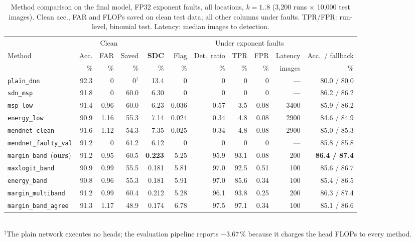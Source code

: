 \documentclass[10pt,a4paper]{article}
\newcommand{\meth}[1]{\texttt{#1}}
\newcommand{\ours}{\meth{margin\_band}}
\begin{document}
\begin{table}[H]
\centering\small
\setlength{\tabcolsep}{3.6pt}
\caption{Method comparison on the final model, FP32 exponent faults, all locations, $k=1..8$
(3{,}200 runs $\times$ 10{,}000 test images). Clean acc., FAR and FLOPs saved on clean test data; all other
columns under faults. TPR/FPR: run-level, binomial test. Latency: median images to detection.}
\label{tab:main}
\begin{adjustbox}{max width=\linewidth}
\begin{tabular}{@{}lrrrrrrrrrr@{}}
\toprule
 & \multicolumn{3}{c}{Clean} & \multicolumn{7}{c}{Under exponent faults} \\
\cmidrule(lr){2-4}\cmidrule(l){5-11}
Method & Acc. & FAR & Saved & \textbf{SDC} & Flag & Det.\ ratio & TPR & FPR & Latency & Acc.\ / fallback \\
 & \% & \% & \% & \% & \% & \% & \% & \% & images & \% \\
\midrule
\meth{plain\_dnn}          & 92.3 & 0    & 0$^\dagger$ & 13.4  & 0      & 0    & 0    & 0     & ---   & 80.0 / 80.0 \\
\meth{sdn\_msp}            & 91.8 & 0    & 60.0 & 6.30  & 0      & 0    & 0    & 0     & ---   & 86.2 / 86.2 \\
\meth{msp\_low}            & 91.4 & 0.96 & 60.0 & 6.23  & 0.036  & 0.57 & 3.5  & 0.08  & 3400  & 85.9 / 86.2 \\
\meth{energy\_low}         & 90.9 & 1.16 & 55.3 & 7.14  & 0.024  & 0.34 & 4.8  & 0.08  & 2900  & 84.6 / 84.9 \\
\meth{mendnet\_clean}      & 91.6 & 1.12 & 54.3 & 7.35  & 0.025  & 0.34 & 4.8  & 0.08  & 2900  & 85.0 / 85.3 \\
\meth{mendnet\_faulty\_val}& 91.2 & 0    & 61.2 & 6.12  & 0      & 0    & 0    & 0     & ---   & 85.8 / 85.8 \\
\midrule
\ours\ (\textbf{ours})     & 91.2 & 0.95 & 60.5 & \textbf{0.223} & 5.25 & 95.9 & 93.1 & 0.08 & 200 & \textbf{86.4 / 87.4} \\
\meth{maxlogit\_band}      & 90.9 & 0.99 & 55.5 & 0.181 & 5.81   & 97.0 & 92.5 & 0.51  & 100   & 85.6 / 86.7 \\
\meth{energy\_band}        & 90.8 & 0.96 & 55.3 & 0.181 & 5.91   & 97.0 & 85.6 & 0.34  & 100   & 85.4 / 86.5 \\
\meth{margin\_multiband}   & 91.2 & 0.99 & 60.4 & 0.212 & 5.28   & 96.1 & 93.8 & 0.25  & 200   & 86.3 / 87.4 \\
\meth{margin\_band\_agree} & 91.3 & 1.17 & 48.9 & 0.174 & 6.78   & 97.5 & 97.1 & 0.34  & 100   & 85.1 / 86.6 \\
\bottomrule
\end{tabular}
\end{adjustbox}\\[2pt]
{\footnotesize $^\dagger$The plain network executes no heads; the evaluation pipeline reports $-3.67\,\%$ because it
charges the head FLOPs to every method.}
\end{table}
\end{document}
